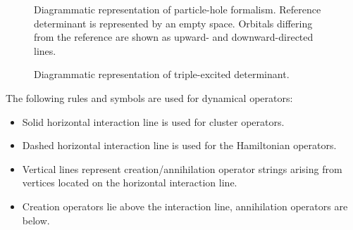 \documentclass[twoside,english]{uiofysmaster}
\begin{document}
\begin{figure}[h!]
\bdiagd
\ediag
	\bdiagd
	\ediag
		\bdiagd
		\ediag
		\bdiagd
		\ediag
		\caption{Diagrammatic representation of particle-hole formalism. Reference determinant is represented by an empty space. Orbitals differing from the reference are shown as upward- and downward-directed lines.} \label{fig:referencediag}
\end{figure}


\begin{figure}[h!]
	  \centering
\bdiagd
\ediag
\caption{Diagrammatic representation of triple-excited determinant.} \label{fig:3detdiag}
\end{figure}

The following rules and symbols are used for dynamical operators:

\begin{itemize}
	\item Solid horizontal interaction line is used for cluster operators.
	\item Dashed horizontal interaction line is used for the Hamiltonian operators.
	\item Vertical lines represent creation/annihilation operator strings arising from vertices located on the horizontal interaction line.
	\item Creation operators lie above the interaction line, annihilation operators are below.
\end{itemize}
\end{document}
